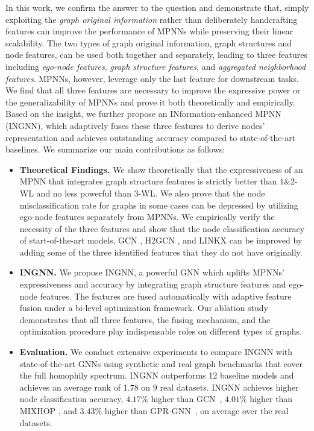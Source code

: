 \documentclass{article}
\theoremstyle{plain}
\newcommand{\pjn}{{INGNN}}
\begin{document}
In this work, we confirm the answer to the question and demonstrate that, simply exploiting the \textit{graph original information} rather than deliberately handcrafting features can improve the performance of MPNNs while preserving their linear scalability. The two types of graph original information, graph structures and node features, can be used both together and separately, leading to three features including \textit{ego-node features}, \textit{graph structure features}, and \textit{aggregated neighborhood features}. 
MPNNs, however, leverage only the last feature for downstream tasks. 
We find that all three features are necessary to improve the expressive power or the generalizability of MPNNs and prove it both theoretically and empirically. 
Based on the insight, we further propose an INformation-enhanced MPNN (\pjn{}), which adaptively fuses these three features to derive nodes' representation and achieves outstanding accuracy compared to state-of-the-art baselines.  
We summarize our main contributions as follows:





\begin{itemize}
    \item \textbf{Theoretical Findings.} 
    We show theoretically that the expressiveness of an MPNN that integrates graph structure features is strictly better than $1\&2$-WL and no less powerful than $3$-WL.
    We also prove that the node misclassification rate for graphs in some cases can be depressed by utilizing ego-node features separately from MPNNs.
    We empirically verify the necessity of the three features and show that the node classification accuracy of start-of-the-art models, GCN \cite{kipf2016semi}, H2GCN \cite{zhu2020beyond}, and LINKX \cite{lim2021large} can be improved by adding some of the three identified features that they do not have originally.

    \item \textbf{\pjn{}.} We propose \pjn{}, a powerful GNN which uplifts MPNNs' expressiveness and accuracy by integrating graph structure features and ego-node features. The features are fused automatically with adaptive feature fusion under a bi-level optimization framework.
    Our ablation study demonstrates that all three features, the fusing mechanism, and the optimization procedure play indispensable roles on different types of graphs.
    
    \item \textbf{Evaluation.} 
    We conduct extensive experiments to compare \pjn{} with state-of-the-art GNNs using synthetic and real graph benchmarks that cover the full homophily spectrum. \pjn{} outperforms 12 baseline models and achieves an average rank of 1.78 on 9 real datasets. \pjn{} achieves higher node classification accuracy, $4.17\%$ higher than GCN~\cite{kipf2016semi}, $4.01\%$ higher than MIXHOP \cite{abu2019mixhop}, and $3.43\%$ higher than GPR-GNN~\cite{chien2020adaptive}, on average over the real datasets.
    
\end{itemize}
\end{document}
